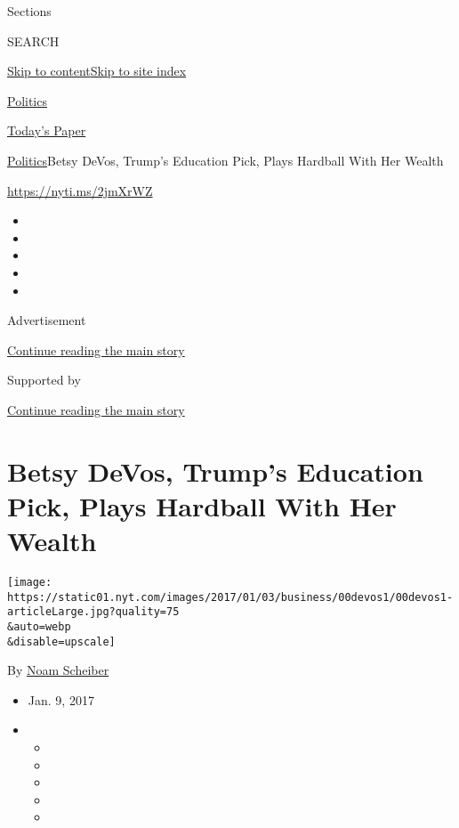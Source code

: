 Sections

SEARCH

\protect\hyperlink{site-content}{Skip to
content}\protect\hyperlink{site-index}{Skip to site index}

\href{https://www.nytimes.com/section/politics}{Politics}

\href{https://myaccount.nytimes.com/auth/login?response_type=cookie\&client_id=vi}{}

\href{https://www.nytimes.com/section/todayspaper}{Today's Paper}

\href{/section/politics}{Politics}\textbar{}Betsy DeVos, Trump's
Education Pick, Plays Hardball With Her Wealth

\url{https://nyti.ms/2jmXrWZ}

\begin{itemize}
\item
\item
\item
\item
\item
\end{itemize}

Advertisement

\protect\hyperlink{after-top}{Continue reading the main story}

Supported by

\protect\hyperlink{after-sponsor}{Continue reading the main story}

\hypertarget{betsy-devos-trumps-education-pick-plays-hardball-with-her-wealth}{%
\section{Betsy DeVos, Trump's Education Pick, Plays Hardball With Her
Wealth}\label{betsy-devos-trumps-education-pick-plays-hardball-with-her-wealth}}

\texttt{[image: https://static01.nyt.com/images/2017/01/03/business/00devos1/00devos1-articleLarge.jpg?quality=75\\\&auto=webp\\\&disable=upscale]}

By \href{https://www.nytimes.com/by/noam-scheiber}{Noam Scheiber}

\begin{itemize}
\item
  Jan. 9, 2017
\item
  \begin{itemize}
  \item
  \item
  \item
  \item
  \item
  \end{itemize}
\end{itemize}

